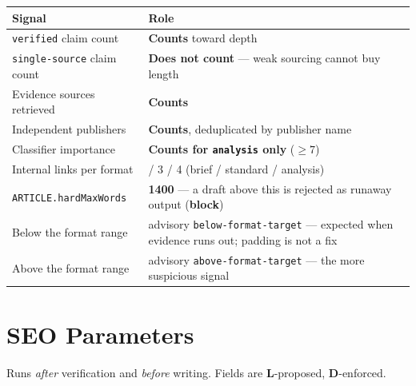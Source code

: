 \documentclass[10pt,a4paper]{article}
\newcommand{\cd}[1]{\texttt{\footnotesize\hyphenpenalty=0\exhyphenpenalty=0\relax #1}}
\newcommand{\D}{\textcolor{go}{\textbf{D}}}
\newcommand{\Lm}{\textcolor{ac}{\textbf{L}}}
\newcommand{\BL}{\textcolor{st}{\textbf{block}}}
\newcommand{\AD}{\textcolor{hd}{advisory}}
\begin{document}
\begin{center}\footnotesize
\begin{tabularx}{\textwidth}{@{}>{\RaggedRight}p{5.0cm} >{\RaggedRight}X@{}}
\toprule
\textbf{Signal} & \textbf{Role} \\
\midrule
\cd{verified} claim count & \textbf{Counts} toward depth \\
\cd{single-source} claim count & \textbf{Does not count} --- weak sourcing cannot buy length \\
Evidence sources retrieved & \textbf{Counts} \\
Independent publishers & \textbf{Counts}, deduplicated by publisher name \\
Classifier importance & \textbf{Counts for \cd{analysis} only} ($\geq 7$) \\
Internal links per format & 2 / 3 / 4 (brief / standard / analysis) \\
\cd{ARTICLE.hardMaxWords} & \textbf{1400} --- a draft above this is rejected as runaway output (\BL) \\
Below the format range & \AD{} \cd{below-format-target} --- expected when evidence runs out; padding is not a fix \\
Above the format range & \AD{} \cd{above-format-target} --- the more suspicious signal \\
\bottomrule
\end{tabularx}
\end{center}

\section{SEO Parameters}

Runs \emph{after} verification and \emph{before} writing. Fields are \Lm-proposed, \D-enforced.
\end{document}
